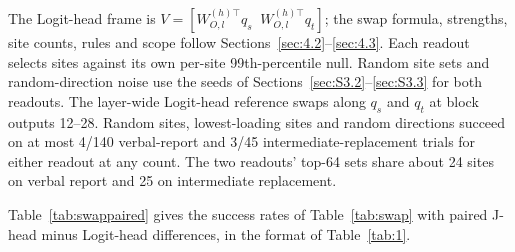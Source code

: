 \documentclass[11pt,a4paper]{article}
\begin{document}
The Logit-head frame is $V=[W_{O,l}^{(h)\top}q_s\;\;W_{O,l}^{(h)\top}q_t]$; the swap formula, strengths, site counts, rules and scope follow Sections~\ref{sec:4.2}--\ref{sec:4.3}. Each readout selects sites against its own per-site 99th-percentile null. Random site sets and random-direction noise use the seeds of Sections~\ref{sec:S3.2}--\ref{sec:S3.3} for both readouts. The layer-wide Logit-head reference swaps along $q_s$ and $q_t$ at block outputs 12--28. Random sites, lowest-loading sites and random directions succeed on at most 4/140 verbal-report and 3/45 intermediate-replacement trials for either readout at any count. The two readouts' top-64 sets share about 24 sites on verbal report and 25 on intermediate replacement.

Table~\ref{tab:swappaired} gives the success rates of Table~\ref{tab:swap} with paired J-head minus Logit-head differences, in the format of Table~\ref{tab:1}.
\end{document}
